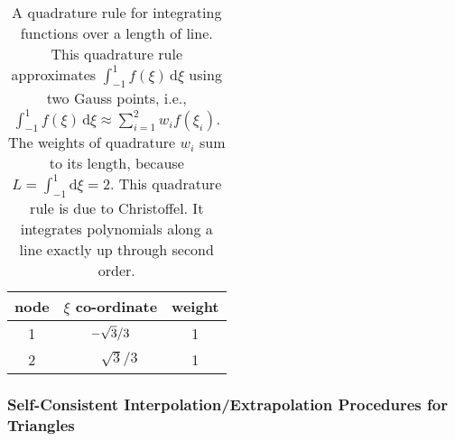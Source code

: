 \begin{table}
    \begin{center}
        \begin{tabular}{|c|cc|}
            \hline
            node & $\xi$ co-ordinate & weight \\ \hline        
            1 & $-\sqrt{3} / 3^{\vphantom{|^|}}$ & 1 \\ 
            2 & $\phantom{-}\sqrt{3} / 3$ & 1 \\ 
            \hline
        \end{tabular}
    \end{center}
    \caption{A quadrature rule for integrating functions over a length of line.  This quadrature rule approximates $\int_{-1}^1 f(\xi) \, \mathrm{d}\xi$ using two Gauss points, i.e., $\int_{-1}^1 f(\xi) \, \mathrm{d}\xi \approx \sum_{i=1}^2 w_i f(\xi_i)$.  The weights of quadrature $w_i$ sum to its length, because $L = \int_{-1}^1 \mathrm{d} \xi = 2$.  This quadrature rule is due to Christoffel.  It integrates polynomials along a line exactly up through second order.}
    \label{tab:2nodeRod}
\end{table}

\subsubsection{Self-Consistent Interpolation\slash Extrapolation Procedures for Triangles}

